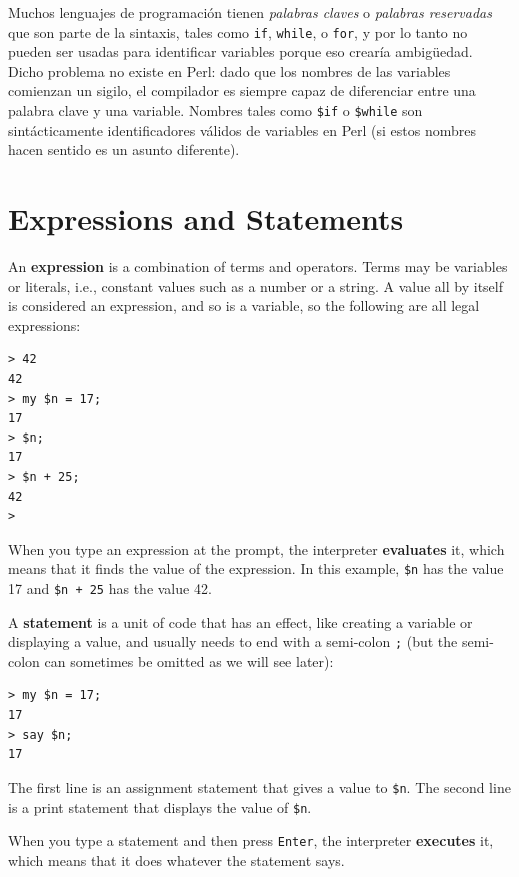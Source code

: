 Muchos lenguajes de programación tienen \emph{palabras claves} o
\emph{palabras reservadas} que son parte de la sintaxis, tales como
{\tt if}, {\tt while}, o {\tt for}, y por lo tanto no pueden ser usadas
para identificar variables porque eso crearía ambigüedad. Dicho problema
no existe en Perl: dado que los nombres de las variables comienzan un sigilo,
el compilador es siempre capaz de diferenciar entre una palabra clave
y una variable. Nombres tales como {\tt \$if} o {\tt \$while} son
sintácticamente identificadores válidos de variables en Perl 
(si estos nombres hacen sentido es un asunto diferente).


\section{Expressions and Statements}
\label{expr_and_statements}

An {\bf expression} is a combination of terms and operators.
Terms may be variables or literals, i.e., constant values such as a number or a string. A value all by itself is considered an expression, and so is
a variable, so the following are all legal expressions:

\begin{verbatim}
> 42
42
> my $n = 17;
17
> $n;
17
> $n + 25;
42
>
\end{verbatim}
%
When you type an expression at the prompt, the interpreter
{\bf evaluates} it, which means that it finds the value of
the expression.
In this example, {\tt \$n} has the value 17 and
{\tt \$n + 25} has the value 42.

A {\bf statement} is a unit of code that has an effect, like
creating a variable or displaying a value, and usually needs to end 
with a semi-colon {\tt ;} (but the semi-colon can sometimes be omitted 
as we will see later):

\begin{verbatim}
> my $n = 17;
17
> say $n;
17
\end{verbatim}
%

The first line is an assignment statement that gives a value to
{\tt \$n}.  The second line is a print statement that displays the
value of {\tt \$n}.

When you type a statement and then press {\tt Enter}, the 
interpreter {\bf executes} it, which means that it does 
whatever the statement says.

